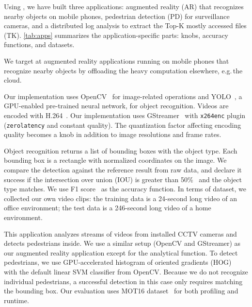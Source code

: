 Using \sysname{}, we have built three applications: augmented reality (AR) that
recognizes nearby objects on mobile phones, pedestrian detection (PD) for
surveillance cameras, and a distributed log analysis to extract the Top-K mostly
accessed files (TK). \autoref{tab:apps} summarizes the application-specific
parts: knobs, accuracy functions, and datasets.

 We target at augmented reality applications running on
mobile phones that recognize nearby objects by offloading the heavy computation
elsewhere, e.g.\,the cloud.

Our implementation uses OpenCV~\cite{opencvlibrary} for image-related operations
and YOLO~\cite{darknet13, redmon2016yolo9000}, a GPU-enabled pre-trained neural
network, for object recognition. Videos are encoded with
H.264~\cite{richardson2011h}. Our implementation uses GStreamer~\cite{gstreamer}
with \texttt{x264enc} plugin (\texttt{zerolatency} and constant quality). The
quantization factor affecting encoding quality becomes a knob in addition to
image resolutions and frame rates.

Object recognition returns a list of bounding boxes with the object type. Each
bounding box is a rectangle with normalized coordinates on the image. We compare
the detection against the reference result from raw data, and declare it success
if the intersection over union (IOU) is greater than
50\%~\cite{everingham2010pascal} and the object type matches. We use F1
score~\cite{Rijsbergen:1979:IR:539927} as the accuracy function. In terms of
dataset, we collected our own video clips: the training data is a 24-second long
video of an office environment; the test data is a 246-second long video of a
home environment.

 This application analyzes streams of videos from
installed CCTV cameras and detects pedestrians inside. We use a similar setup
(OpenCV and GStreamer) as our augmented reality application except for the
analytical function. To detect pedestrians, we use GPU-accelerated histogram of
oriented gradients (HOG)~\cite{dalal2005histograms} with the default linear SVM
classifier from OpenCV. Because we do not recognize individual pedestrians, a
successful detection in this case only requires matching the bounding box. Our
evaluation uses MOT16 dataset~\cite{milan2016mot16} for both profiling and
runtime.

